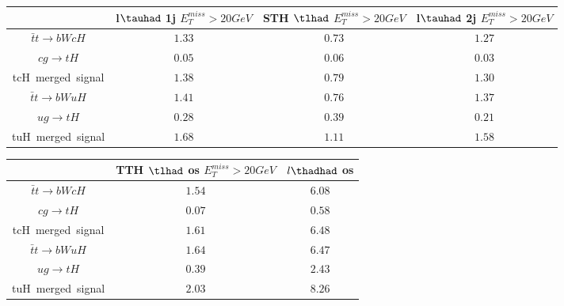 \centering
\begin{tabular}{|c|c|c|c|} \hline
 & l$\tauhad$ 1j  $E_T^{miss}>20GeV$ & STH $\tlhad$   $E_T^{miss}>20GeV$ & l$\tauhad$ 2j  $E_T^{miss}>20GeV$\\\hline
$\bar{t}t\to bWcH$ & $1.33$ & $0.73$ & $1.27$\\\hline
$cg\to tH$ & $0.05$ & $0.06$ & $0.03$\\\hline
tcH~merged~signal & $1.38$ & $0.79$ & $1.30$\\\hline
$\bar{t}t\to bWuH$ & $1.41$ & $0.76$ & $1.37$\\\hline
$ug\to tH$ & $0.28$ & $0.39$ & $0.21$\\\hline
tuH~merged~signal & $1.68$ & $1.11$ & $1.58$\\\hline
\end{tabular}
\begin{tabular}{|c|c|c|} \hline
 & TTH $\tlhad$ os  $E_T^{miss}>20GeV$ & $l\thadhad$ os\\\hline
$\bar{t}t\to bWcH$ & $1.54$ & $6.08$\\\hline
$cg\to tH$ & $0.07$ & $0.58$\\\hline
tcH~merged~signal & $1.61$ & $6.48$\\\hline
$\bar{t}t\to bWuH$ & $1.64$ & $6.47$\\\hline
$ug\to tH$ & $0.39$ & $2.43$\\\hline
tuH~merged~signal & $2.03$ & $8.26$\\\hline
\end{tabular}
